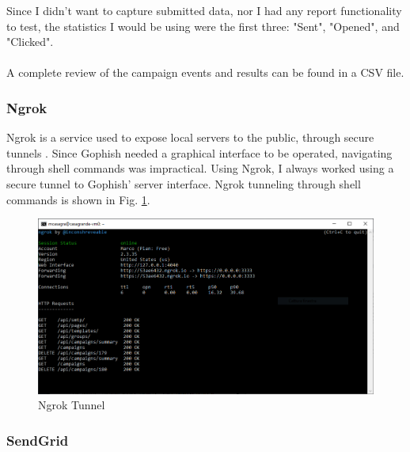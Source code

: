 \documentclass[a4paper]{article}
\begin{document}
\noindent
Since I didn't want to capture submitted data, nor I had any report functionality to test, the statistics I would be using were the first three: "Sent", "Opened", and "Clicked".
\\ \\
A complete review of the campaign events and results can be found in a CSV file.

\subsubsection{Ngrok}

Ngrok is a service used to expose local servers to the public, through secure tunnels \cite{tools-ngrok}. Since Gophish needed a graphical interface to be operated, navigating through shell commands was impractical. Using Ngrok, I always worked using a secure tunnel to Gophish' server interface. Ngrok tunneling through shell commands is shown in Fig. \ref{ngrok-tunnel}.

\begin{figure}[H]
	\centering
	\includegraphics[scale=0.35]{images/tools/ngrok-tunnel.PNG}
	\caption{Ngrok Tunnel}
	\label{ngrok-tunnel}
\end{figure}

\subsubsection{SendGrid}
\end{document}

